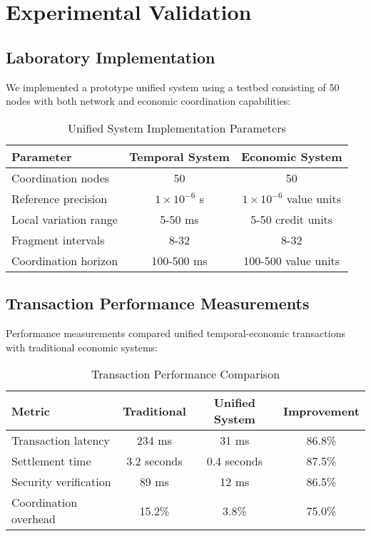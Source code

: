 \documentclass[12pt,a4paper]{article}
\begin{document}
\section{Experimental Validation}

\subsection{Laboratory Implementation}

We implemented a prototype unified system using a testbed consisting of 50 nodes with both network and economic coordination capabilities:

\begin{table}[htbp]
\centering
\caption{Unified System Implementation Parameters}
\begin{tabular}{@{}lcc@{}}
\toprule
\textbf{Parameter} & \textbf{Temporal System} & \textbf{Economic System} \\
\midrule
Coordination nodes & 50 & 50 \\
Reference precision & $1 \times 10^{-6}$ s & $1 \times 10^{-6}$ value units \\
Local variation range & 5-50 ms & 5-50 credit units \\
Fragment intervals & 8-32 & 8-32 \\
Coordination horizon & 100-500 ms & 100-500 value units \\
\bottomrule
\end{tabular}
\end{table}

\subsection{Transaction Performance Measurements}

Performance measurements compared unified temporal-economic transactions with traditional economic systems:

\begin{table}[htbp]
\centering
\caption{Transaction Performance Comparison}
\begin{tabular}{@{}lccc@{}}
\toprule
\textbf{Metric} & \textbf{Traditional} & \textbf{Unified System} & \textbf{Improvement} \\
\midrule
Transaction latency & 234 ms & 31 ms & 86.8\% \\
Settlement time & 3.2 seconds & 0.4 seconds & 87.5\% \\
Security verification & 89 ms & 12 ms & 86.5\% \\
Coordination overhead & 15.2\% & 3.8\% & 75.0\% \\
\bottomrule
\end{tabular}
\end{table}
\end{document}
